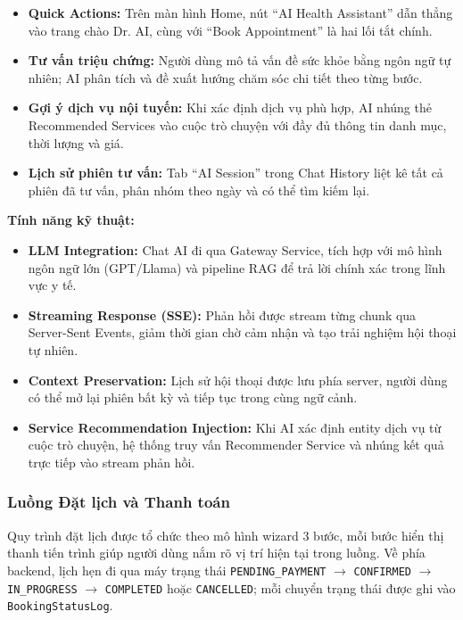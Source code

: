 \begin{itemize}
    \item \textbf{Quick Actions:} Trên màn hình Home, nút ``AI Health Assistant'' dẫn thẳng vào trang chào Dr. AI, cùng với ``Book Appointment'' là hai lối tắt chính.
    \item \textbf{Tư vấn triệu chứng:} Người dùng mô tả vấn đề sức khỏe bằng ngôn ngữ tự nhiên; AI phân tích và đề xuất hướng chăm sóc chi tiết theo từng bước.
    \item \textbf{Gợi ý dịch vụ nội tuyến:} Khi xác định dịch vụ phù hợp, AI nhúng thẻ Recommended Services vào cuộc trò chuyện với đầy đủ thông tin danh mục, thời lượng và giá.
    \item \textbf{Lịch sử phiên tư vấn:} Tab ``AI Session'' trong Chat History liệt kê tất cả phiên đã tư vấn, phân nhóm theo ngày và có thể tìm kiếm lại.
\end{itemize}

\textbf{Tính năng kỹ thuật:}

\begin{itemize}
    \item \textbf{LLM Integration:} Chat AI đi qua Gateway Service, tích hợp với mô hình ngôn ngữ lớn (GPT/Llama) và pipeline RAG để trả lời chính xác trong lĩnh vực y tế.
    \item \textbf{Streaming Response (SSE):} Phản hồi được stream từng chunk qua Server-Sent Events, giảm thời gian chờ cảm nhận và tạo trải nghiệm hội thoại tự nhiên.
    \item \textbf{Context Preservation:} Lịch sử hội thoại được lưu phía server, người dùng có thể mở lại phiên bất kỳ và tiếp tục trong cùng ngữ cảnh.
    \item \textbf{Service Recommendation Injection:} Khi AI xác định entity dịch vụ từ cuộc trò chuyện, hệ thống truy vấn Recommender Service và nhúng kết quả trực tiếp vào stream phản hồi.
\end{itemize}

\subsubsection{Luồng Đặt lịch và Thanh toán}

Quy trình đặt lịch được tổ chức theo mô hình wizard 3 bước, mỗi bước hiển thị thanh tiến trình giúp người dùng nắm rõ vị trí hiện tại trong luồng. Về phía backend, lịch hẹn đi qua máy trạng thái \texttt{PENDING\_PAYMENT} $\rightarrow$ \texttt{CONFIRMED} $\rightarrow$ \texttt{IN\_PROGRESS} $\rightarrow$ \texttt{COMPLETED} hoặc \texttt{CANCELLED}; mỗi chuyển trạng thái được ghi vào \texttt{BookingStatusLog}.

